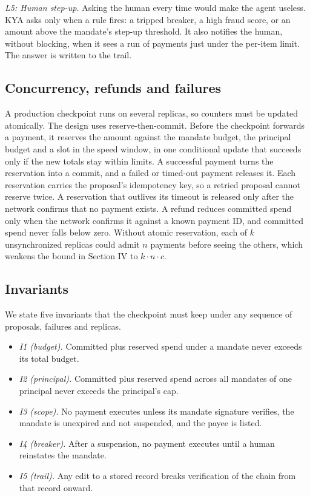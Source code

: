 \documentclass[conference]{IEEEtran}
\begin{document}
\emph{L5: Human step-up.} Asking the human every time would make the agent useless. KYA asks only when a rule fires: a tripped breaker, a high fraud score, or an amount above the mandate's step-up threshold. It also notifies the human, without blocking, when it sees a run of payments just under the per-item limit. The answer is written to the trail.

\subsection{Concurrency, refunds and failures}

A production checkpoint runs on several replicas, so counters must be updated atomically. The design uses reserve-then-commit. Before the checkpoint forwards a payment, it reserves the amount against the mandate budget, the principal budget and a slot in the speed window, in one conditional update that succeeds only if the new totals stay within limits. A successful payment turns the reservation into a commit, and a failed or timed-out payment releases it. Each reservation carries the proposal's idempotency key, so a retried proposal cannot reserve twice. A reservation that outlives its timeout is released only after the network confirms that no payment exists. A refund reduces committed spend only when the network confirms it against a known payment ID, and committed spend never falls below zero. Without atomic reservation, each of $k$ unsynchronized replicas could admit $n$ payments before seeing the others, which weakens the bound in Section IV to $k \cdot n \cdot c$.

\subsection{Invariants}

We state five invariants that the checkpoint must keep under any sequence of proposals, failures and replicas.

\begin{itemize}
\item
  \emph{I1 (budget).} Committed plus reserved spend under a mandate never exceeds its total budget.
\item
  \emph{I2 (principal).} Committed plus reserved spend across all mandates of one principal never exceeds the principal's cap.
\item
  \emph{I3 (scope).} No payment executes unless its mandate signature verifies, the mandate is unexpired and not suspended, and the payee is listed.
\item
  \emph{I4 (breaker).} After a suspension, no payment executes until a human reinstates the mandate.
\item
  \emph{I5 (trail).} Any edit to a stored record breaks verification of the chain from that record onward.
\end{itemize}
\end{document}
